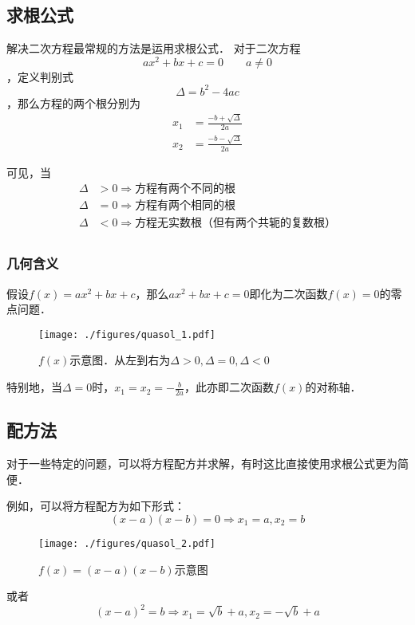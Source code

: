 
\subsection{求根公式}
解决二次方程最常规的方法是运用求根公式．
对于二次方程$$ax^2+bx+c=0 \qquad a\neq 0$$，定义判别式$$\Delta = b^2-4ac$$，那么方程的两个根分别为$$
\begin{aligned}
x_1&=\frac{-b+\sqrt{\Delta}}{2a}\\
x_2&=\frac{-b-\sqrt{\Delta}}{2a}
\end{aligned}
$$

可见，当
$$
\begin{aligned}
\Delta &> 0 \Rightarrow \text{方程有两个不同的根}\\
\Delta &= 0 \Rightarrow \text{方程有两个相同的根}\\
\Delta &< 0 \Rightarrow \text{方程无实数根（但有两个共轭的复数根）}\\
\end{aligned}
$$

\subsubsection{几何含义}
假设$f(x)=ax^2+bx+c$，那么$ax^2+bx+c=0$即化为二次函数$f(x)=0$的零点问题．
\begin{figure}[ht]
\centering
\texttt{[image: ./figures/quasol\_1.pdf]}
\caption{$f(x)$示意图．从左到右为$\Delta > 0, \Delta = 0, \Delta < 0$} \label{quasol_fig1}
\end{figure}
特别地，当$\Delta =0$时，$x_1=x_2=-\frac{b}{2a}$，此亦即二次函数$f(x)$的对称轴．

\subsection{配方法}
对于一些特定的问题，可以将方程配方并求解，有时这比直接使用求根公式更为简便．

例如，可以将方程配方为如下形式：
$$(x-a)(x-b)=0\Rightarrow x_1=a, x_2=b$$
\begin{figure}[ht]
\centering
\texttt{[image: ./figures/quasol\_2.pdf]}
\caption{$f(x)=(x-a)(x-b)$示意图} \label{quasol_fig2}
\end{figure}

或者
$$(x-a)^2=b\Rightarrow x_1=\sqrt{b}+a, x_2=-\sqrt{b}+a$$
